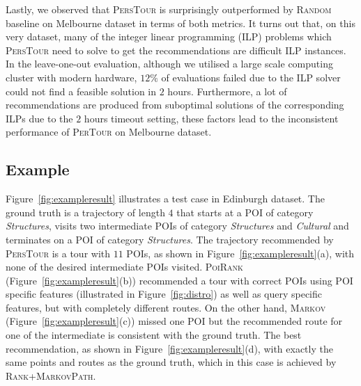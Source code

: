 Lastly, we observed that \textsc{PersTour} is surprisingly outperformed by \textsc{Random} baseline
on Melbourne dataset in terms of both metrics.
It turns out that, on this very dataset, many of the integer linear programming (ILP) problems
which \textsc{PersTour} need to solve to get the recommendations are difficult ILP instances.
In the leave-one-out evaluation, although we utilised a large scale computing cluster with modern hardware,
$12\%$ of evaluations failed due to the ILP solver could not find a feasible solution in $2$ hours.
Furthermore, a lot of recommendations are produced from suboptimal solutions of the corresponding ILPs due to
the $2$ hours timeout setting, these factors lead to the inconsistent performance of \textsc{PerTour} on Melbourne dataset.


\subsection{Example}
\label{sec:example}
\secmoveup

Figure~\ref{fig:exampleresult} illustrates a test case in Edinburgh dataset.
The ground truth is a trajectory of length $4$ that starts at a POI of category \textit{Structures},
visits two intermediate POIs of category \textit{Structures} and \textit{Cultural} and
terminates on a POI of category \textit{Structures}.
The trajectory recommended by \textsc{PersTour} is a tour with $11$ POIs, as shown in Figure~\ref{fig:exampleresult}(a),
with none of the desired intermediate POIs visited.
\textsc{PoiRank} (Figure~\ref{fig:exampleresult}(b)) recommended a tour with correct POIs using
POI specific features (illustrated in Figure~\ref{fig:distro}) as well as query specific features,
but with completely different routes.
On the other hand, \textsc{Markov} (Figure~\ref{fig:exampleresult}(c)) missed one POI but the recommended route for one of the intermediate is consistent with the ground truth.
The best recommendation, as shown in Figure~\ref{fig:exampleresult}(d), with exactly the same points and routes as the ground truth,
which in this case is achieved by \textsc{Rank+MarkovPath}.




